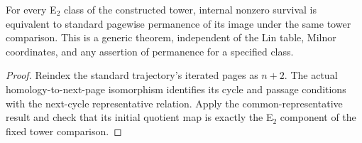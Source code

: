 \begin{proposition}
  \label{prop:h6-tower-survival-comparison}
  \leanok
  For every E$_2$ class of the constructed tower, internal nonzero survival
  is equivalent to standard pagewise permanence of its image under the same
  tower comparison. This is a generic theorem, independent of the Lin table,
  Milnor coordinates, and any assertion of permanence for a specified class.
\end{proposition}
\begin{proof}
  Reindex the standard trajectory's iterated pages as $n+2$. The actual
  homology-to-next-page isomorphism identifies its cycle and passage conditions
  with the next-cycle representative relation. Apply the common-representative
  result and check that its initial quotient map is exactly the E$_2$ component
  of the fixed tower comparison.
  \leanok
\end{proof}
